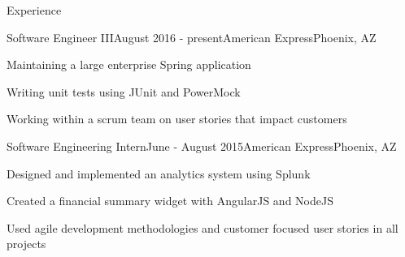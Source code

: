 \documentclass{resume} %
\begin{document}
\begin{rSection}{Experience}

\begin{rSubsection}{Software Engineer III}{August 2016 - present}{American Express}{Phoenix, AZ}
\item Maintaining a large enterprise Spring application
\item Writing unit tests using JUnit and PowerMock
\item Working within a scrum team on user stories that impact customers
\end{rSubsection}
\begin{rSubsection}{Software Engineering Intern}{June - August 2015}{American Express}{Phoenix, AZ}
\item Designed and implemented an analytics system using Splunk 
\item Created a financial summary widget with AngularJS and NodeJS
\item Used agile development methodologies and customer focused user stories in all projects
\end{rSubsection}






\end{rSection}
\end{document}
